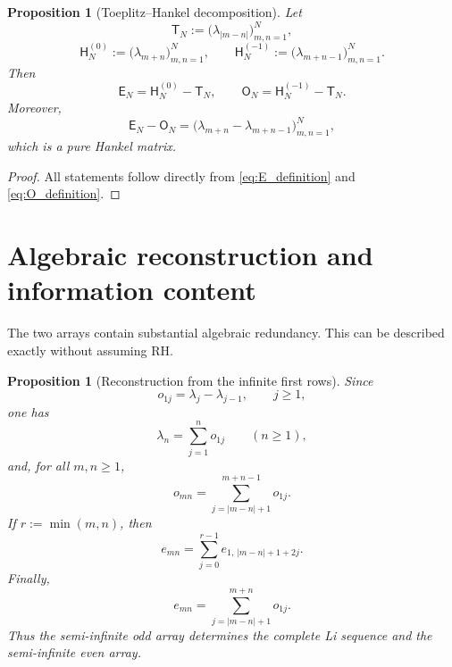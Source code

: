\documentclass[preprint,12pt]{elsarticle}
\numberwithin{equation}{section}
\theoremstyle{plain}
\newtheorem{proposition}[theorem]{Proposition}
\theoremstyle{definition}
\theoremstyle{remark}
\newcommand{\RH}{\mathrm{RH}}
\newcommand{\E}{\mathsf E}
\newcommand{\Omat}{\mathsf O}
\begin{document}
\begin{proposition}[Toeplitz--Hankel decomposition]
\label{prop:toeplitz_hankel}
Let
\begin{equation}
\mathsf T_N:=\bigl(\lambda_{|m-n|}\bigr)_{m,n=1}^N,
\label{eq:T_definition}
\end{equation}
\begin{equation}
\mathsf H_N^{(0)}:=\bigl(\lambda_{m+n}\bigr)_{m,n=1}^N,
\qquad
\mathsf H_N^{(-1)}:=\bigl(\lambda_{m+n-1}\bigr)_{m,n=1}^N.
\label{eq:H_definitions}
\end{equation}
Then
\begin{equation}
\E_N=\mathsf H_N^{(0)}-\mathsf T_N,
\qquad
\Omat_N=\mathsf H_N^{(-1)}-\mathsf T_N.
\label{eq:toeplitz_hankel_decomposition}
\end{equation}
Moreover,
\begin{equation}
\E_N-\Omat_N
=\bigl(\lambda_{m+n}-\lambda_{m+n-1}\bigr)_{m,n=1}^N,
\label{eq:E_minus_O}
\end{equation}
which is a pure Hankel matrix.
\end{proposition}

\begin{proof}
All statements follow directly from \eqref{eq:E_definition} and \eqref{eq:O_definition}.
\end{proof}

\section{Algebraic reconstruction and information content}
\label{sec:algebraic_reconstruction}

The two arrays contain substantial algebraic redundancy.  This can be described exactly without assuming $\RH$.

\begin{proposition}[Reconstruction from the infinite first rows]
\label{prop:first_row_reconstruction}
Since
\begin{equation}
o_{1j}=\lambda_j-\lambda_{j-1},
\qquad j\ge1,
\label{eq:odd_first_row_differences}
\end{equation}
one has
\begin{equation}
\lambda_n=\sum_{j=1}^{n}o_{1j}
\qquad(n\ge1),
\label{eq:lambda_from_O_first_row}
\end{equation}
and, for all $m,n\ge1$,
\begin{equation}
o_{mn}
=\sum_{j=|m-n|+1}^{m+n-1}o_{1j}.
\label{eq:O_interval_sum_reconstruction}
\end{equation}
If $r:=\min(m,n)$, then
\begin{equation}
e_{mn}
=\sum_{j=0}^{r-1}
e_{1,\,|m-n|+1+2j}.
\label{eq:E_step_two_reconstruction}
\end{equation}
Finally,
\begin{equation}
e_{mn}
=\sum_{j=|m-n|+1}^{m+n}o_{1j}.
\label{eq:E_from_O_first_row}
\end{equation}
Thus the semi-infinite odd array determines the complete Li sequence and the semi-infinite even array.
\end{proposition}
\end{document}
